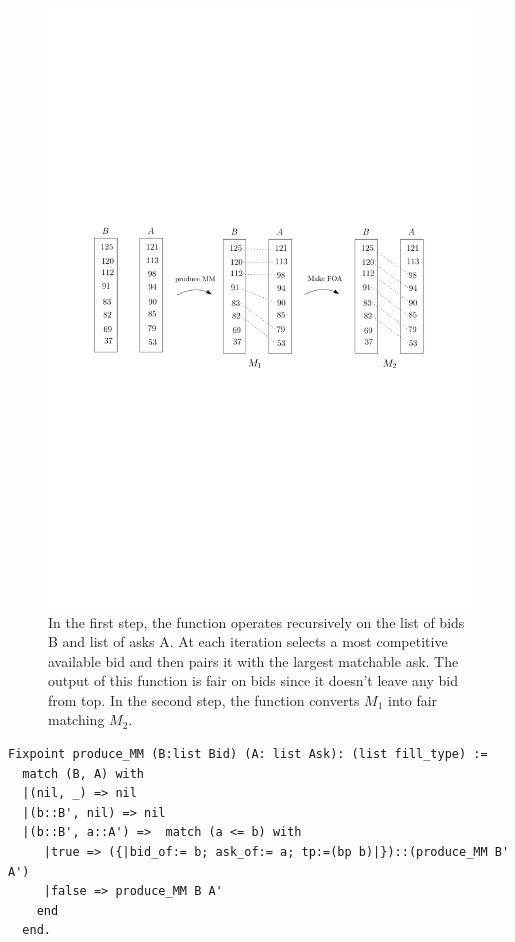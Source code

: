\documentclass[a4paper,UKenglish,cleveref, autoref]{lipics-v2019}
\begin{document}
\begin{figure}[h!]
\centering
\includegraphics[width=.6\textwidth]{MM.pdf}
\caption{In the first step, the function  operates recursively on the list of bids B and list of asks A. At each iteration  selects a most competitive available bid and then pairs it with the largest matchable ask. The output of this function is fair on bids since it doesn't leave any bid from top. In the second step, the function  converts  $M_1$ into fair matching $M_2$. }
\label{fig:mm}
\end{figure}

\begin{verbatim}
Fixpoint produce_MM (B:list Bid) (A: list Ask): (list fill_type) :=
  match (B, A) with
  |(nil, _) => nil
  |(b::B', nil) => nil              
  |(b::B', a::A') =>  match (a <= b) with
     |true => ({|bid_of:= b; ask_of:= a; tp:=(bp b)|})::(produce_MM B' A')
     |false => produce_MM B A'
    end
  end. 
\end{verbatim}
\end{document}
